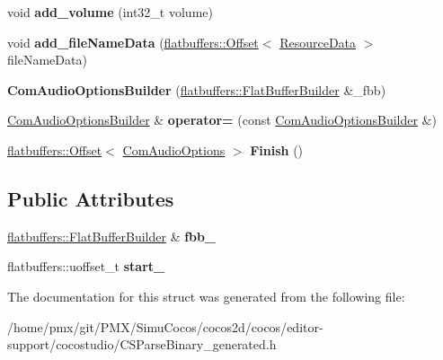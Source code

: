 \begin{DoxyCompactItemize}
void {\bfseries add\+\_\+volume} (int32\+\_\+t volume)
\item 
\mbox{\label{structflatbuffers_1_1ComAudioOptionsBuilder_a74e4b03d9397d027c8c0a392cc6ac765}} 
void {\bfseries add\+\_\+file\+Name\+Data} (\hyperlink{structflatbuffers_1_1Offset}{flatbuffers\+::\+Offset}$<$ \hyperlink{structflatbuffers_1_1ResourceData}{Resource\+Data} $>$ file\+Name\+Data)
\item 
\mbox{\label{structflatbuffers_1_1ComAudioOptionsBuilder_a91e8d1ea36c4dd8ec776f73af7bda804}} 
{\bfseries Com\+Audio\+Options\+Builder} (\hyperlink{classflatbuffers_1_1FlatBufferBuilder}{flatbuffers\+::\+Flat\+Buffer\+Builder} \&\+\_\+fbb)
\item 
\mbox{\label{structflatbuffers_1_1ComAudioOptionsBuilder_a4c99a87bc8202546db1bcac68e370b3f}} 
\hyperlink{structflatbuffers_1_1ComAudioOptionsBuilder}{Com\+Audio\+Options\+Builder} \& {\bfseries operator=} (const \hyperlink{structflatbuffers_1_1ComAudioOptionsBuilder}{Com\+Audio\+Options\+Builder} \&)
\item 
\mbox{\label{structflatbuffers_1_1ComAudioOptionsBuilder_a02d25bc746c66025b23f596069abcd49}} 
\hyperlink{structflatbuffers_1_1Offset}{flatbuffers\+::\+Offset}$<$ \hyperlink{structflatbuffers_1_1ComAudioOptions}{Com\+Audio\+Options} $>$ {\bfseries Finish} ()
\end{DoxyCompactItemize}
\subsection*{Public Attributes}
\begin{DoxyCompactItemize}
\item 
\mbox{\label{structflatbuffers_1_1ComAudioOptionsBuilder_ab0cbfff78e489d8d4b5af553051d0654}} 
\hyperlink{classflatbuffers_1_1FlatBufferBuilder}{flatbuffers\+::\+Flat\+Buffer\+Builder} \& {\bfseries fbb\+\_\+}
\item 
\mbox{\label{structflatbuffers_1_1ComAudioOptionsBuilder_a4892a2310620a609d45ad699d6d1a852}} 
flatbuffers\+::uoffset\+\_\+t {\bfseries start\+\_\+}
\end{DoxyCompactItemize}


The documentation for this struct was generated from the following file\+:\begin{DoxyCompactItemize}
\item 
/home/pmx/git/\+P\+M\+X/\+Simu\+Cocos/cocos2d/cocos/editor-\/support/cocostudio/C\+S\+Parse\+Binary\+\_\+generated.\+h\end{DoxyCompactItemize}

